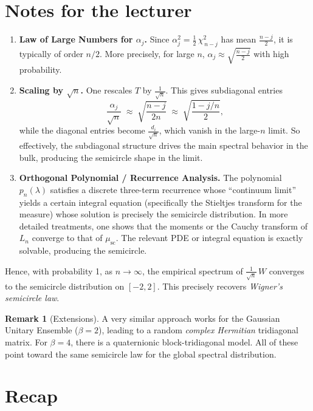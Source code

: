 \documentclass[letterpaper,11pt,oneside,reqno]{article}
\numberwithin{equation}{section}
\theoremstyle{definition}
\newtheorem{remark}[proposition]{Remark}
\newenvironment{lnotes}{\section*{Notes for the lecturer}}{}
\begin{document}
\begin{lnotes}
\begin{enumerate}[1.]
\item \textbf{Law of Large Numbers for \(\alpha_j\).}
   Since \(\alpha_j^2 = \tfrac12\,\chi^2_{\,n-j}\) has mean \(\tfrac{n-j}{2}\), it is typically of order \(n/2\).  More precisely, for large \(n\), \(\alpha_j \approx \sqrt{\tfrac{n-j}{2}}\) with high probability.

\item \textbf{Scaling by \(\sqrt{n}\).}
   One rescales \(T\) by \(\tfrac{1}{\sqrt{n}}\).  This gives subdiagonal entries
   \[
     \frac{\alpha_j}{\sqrt{n}}
     \;\approx\;
     \sqrt{\frac{n-j}{2n}}
     \;\approx\;
     \sqrt{\frac{1 - j/n}{2}},
   \]
   while the diagonal entries become \(\tfrac{d_i}{\sqrt{n}}\), which vanish in the large-\(n\) limit.  So effectively, the subdiagonal structure drives the main spectral behavior in the bulk, producing the semicircle shape in the limit.

\item \textbf{Orthogonal Polynomial / Recurrence Analysis.}
   The polynomial \(p_n(\lambda)\) satisfies a discrete three-term recurrence whose ``continuum limit'' yields a certain integral equation (specifically the Stieltjes transform for the measure) whose solution is precisely the semicircle distribution.  In more detailed treatments, one shows that the moments or the Cauchy transform of \(L_n\) converge to that of \(\mu_{\mathrm{sc}}\).  The relevant PDE or integral equation is exactly solvable, producing the semicircle.

\end{enumerate}

Hence, with probability 1, as \(n\to\infty\), the empirical spectrum of \(\tfrac{1}{\sqrt{n}}\,W\) converges to the semicircle distribution on \([-2,2]\).  This precisely recovers \emph{Wigner’s semicircle law}.

\begin{remark}[Extensions]
A very similar approach works for the Gaussian Unitary Ensemble (\(\beta=2\)), leading to a random \emph{complex Hermitian} tridiagonal matrix.  For \(\beta=4\), there is a quaternionic block-tridiagonal model.  All of these point toward the same semicircle law for the global spectral distribution.
\end{remark}


\end{lnotes}





\section{Recap}
\end{document}
